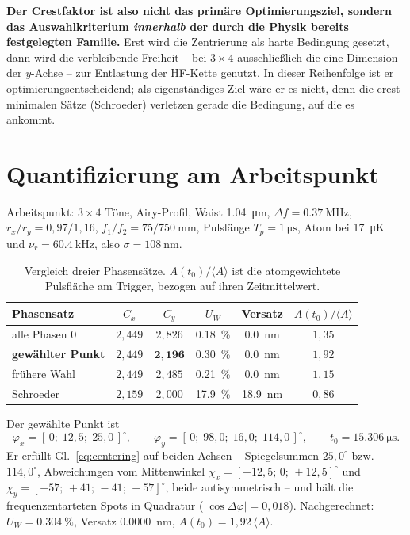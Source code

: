\documentclass[11pt,a4paper]{article}
\newcommand{\crest}{\ensuremath{C}}
\newcommand{\Uw}{\ensuremath{U_W}}
\begin{document}
\medskip
\noindent\textbf{Der Crestfaktor ist also nicht das primäre Optimierungsziel,
sondern das Auswahlkriterium \emph{innerhalb} der durch die Physik bereits
festgelegten Familie.} Erst wird die Zentrierung als harte Bedingung gesetzt,
dann wird die verbleibende Freiheit -- bei $3\times4$ ausschließlich die eine
Dimension der $y$-Achse -- zur Entlastung der HF-Kette genutzt. In dieser
Reihenfolge ist er optimierungsentscheidend; als eigenständiges Ziel wäre er
es nicht, denn die crest-minimalen Sätze (Schroeder) verletzen gerade die
Bedingung, auf die es ankommt.

\section{Quantifizierung am Arbeitspunkt}

Arbeitspunkt: $3\times4$ Töne, Airy-Profil, Waist \SI{1.04}{\micro\meter},
$\Delta f = \SI{0.37}{\mega\hertz}$, $r_x/r_y = 0{,}97/1{,}16$,
$f_1/f_2 = 75/\SI{750}{\milli\meter}$, Pulslänge $T_p=\SI{1}{\micro\second}$,
Atom bei \SI{17}{\micro\kelvin} und $\nu_r=\SI{60.4}{\kilo\hertz}$, also
$\sigma=\SI{108}{\nano\meter}$.

\begin{table}[htb]
  \centering
  \caption{Vergleich dreier Phasensätze. $A(t_0)/\langle A\rangle$ ist die
  atomgewichtete Pulsfläche am Trigger, bezogen auf ihren Zeitmittelwert.}
  \label{tab:vergleich}
  \begin{tabular}{lccccc}
    \toprule
    Phasensatz & $\crest_x$ & $\crest_y$ & $\Uw$ & Versatz & $A(t_0)/\langle A\rangle$\\
    \midrule
    alle Phasen $0$ & $2{,}449$ & $2{,}826$ & \SI{0.18}{\percent} & \SI{0.0}{\nano\meter} & $1{,}35$\\
    \textbf{gewählter Punkt} & $2{,}449$ & $\mathbf{2{,}196}$ & \SI{0.30}{\percent} & \SI{0.0}{\nano\meter} & $1{,}92$\\
    frühere Wahl    & $2{,}449$ & $2{,}485$ & \SI{0.21}{\percent} & \SI{0.0}{\nano\meter} & $1{,}15$\\
    Schroeder       & $2{,}159$ & $2{,}000$ & \SI{17.9}{\percent} & \SI{18.9}{\nano\meter} & $0{,}86$\\
    \bottomrule
  \end{tabular}
\end{table}

Der gewählte Punkt ist
\begin{equation}
  \varphi_x=[\,0;\;12{,}5;\;25{,}0\,]^\circ,\qquad
  \varphi_y=[\,0;\;98{,}0;\;16{,}0;\;114{,}0\,]^\circ,\qquad
  t_0=\SI{15.306}{\micro\second}.
  \label{eq:workingpoint}
\end{equation}
Er erfüllt Gl.~\eqref{eq:centering} auf beiden Achsen -- Spiegelsummen
$25{,}0^\circ$ bzw.\ $114{,}0^\circ$, Abweichungen vom Mittenwinkel
$\chi_x=[-12{,}5;\,0;\,+12{,}5]^\circ$ und
$\chi_y=[-57;\,+41;\,-41;\,+57]^\circ$, beide antisymmetrisch -- und hält die
frequenzentarteten Spots in Quadratur ($|\cos\Delta\varphi| = 0{,}018$).
Nachgerechnet: $\Uw=\SI{0.304}{\percent}$, Versatz \SI{0.0000}{\nano\meter},
$A(t_0)=1{,}92\,\langle A\rangle$.
\end{document}
